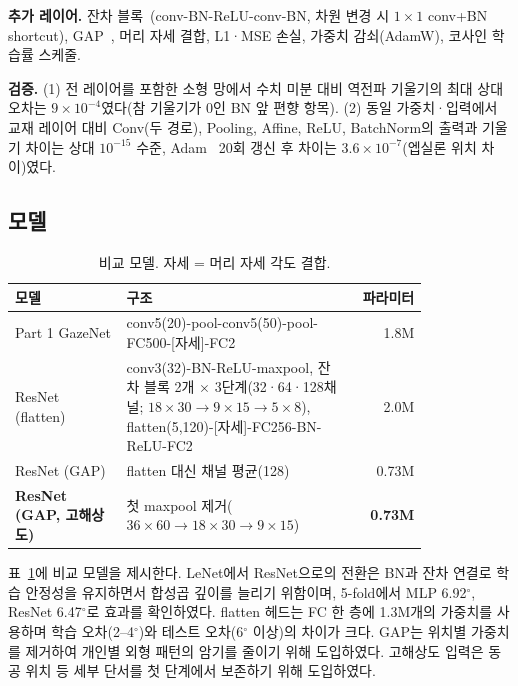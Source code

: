 \documentclass[10pt,twocolumn,a4paper]{article}
\newcommand{\dg}{^\circ}
\begin{document}
\textbf{추가 레이어.} 잔차 블록~\cite{resnet}(conv-BN-ReLU-conv-BN, 차원 변경 시 $1\times1$ conv+BN shortcut), GAP~\cite{nin}, 머리 자세 결합, L1·MSE 손실, 가중치 감쇠(AdamW), 코사인 학습률 스케줄.

\textbf{검증.} (1) 전 레이어를 포함한 소형 망에서 수치 미분 대비 역전파 기울기의 최대 상대 오차는 $9\times10^{-4}$였다(참 기울기가 0인 BN 앞 편향 항목). (2) 동일 가중치·입력에서 교재 레이어 대비 Conv(두 경로), Pooling, Affine, ReLU, BatchNorm의 출력과 기울기 차이는 상대 $10^{-15}$ 수준, Adam~\cite{adam} 20회 갱신 후 차이는 $3.6\times10^{-7}$(엡실론 위치 차이)였다.

\subsection{모델}
\begin{table}[H]
\centering\small
\caption{비교 모델. 자세 = 머리 자세 각도 결합.}
\label{tab:models}
\setlength{\tabcolsep}{3pt}
\begin{tabular}{@{}p{0.27\linewidth}p{0.55\linewidth}r@{}}
\toprule
모델 & 구조 & 파라미터\\
\midrule
Part 1 GazeNet & conv5(20)-pool-conv5(50)-pool-FC500-[자세]-FC2 & 1.8M\\
ResNet (flatten) & conv3(32)-BN-ReLU-maxpool, 잔차 블록 2개 $\times$ 3단계(32·64·128채널; $18{\times}30\to9{\times}15\to5{\times}8$), flatten(5,120)-[자세]-FC256-BN-ReLU-FC2 & 2.0M\\
ResNet (GAP) & flatten 대신 채널 평균(128) & 0.73M\\
\textbf{ResNet (GAP, 고해상도)} & 첫 maxpool 제거($36{\times}60\to18{\times}30\to9{\times}15$) & \textbf{0.73M}\\
\bottomrule
\end{tabular}
\end{table}
표~\ref{tab:models}에 비교 모델을 제시한다. LeNet에서 ResNet으로의 전환은 BN과 잔차 연결로 학습 안정성을 유지하면서 합성곱 깊이를 늘리기 위함이며, 5-fold에서 MLP 6.92$\dg$, ResNet 6.47$\dg$로 효과를 확인하였다. flatten 헤드는 FC 한 층에 1.3M개의 가중치를 사용하며 학습 오차(2--4$\dg$)와 테스트 오차(6$\dg$ 이상)의 차이가 크다. GAP는 위치별 가중치를 제거하여 개인별 외형 패턴의 암기를 줄이기 위해 도입하였다. 고해상도 입력은 동공 위치 등 세부 단서를 첫 단계에서 보존하기 위해 도입하였다.
\end{document}
